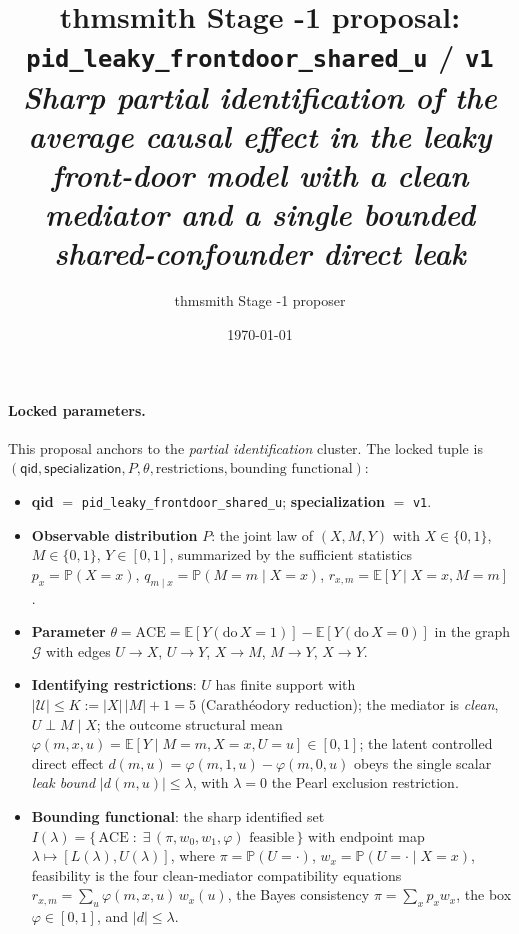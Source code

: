 \documentclass[11pt]{article}
\title{thmsmith Stage -1 proposal: \texttt{pid\_leaky\_frontdoor\_shared\_u} / \texttt{v1}%
  \\ \large\textit{Sharp partial identification of the average causal effect in the leaky front-door model with a clean mediator and a single bounded shared-confounder direct leak}}
\author{thmsmith Stage -1 proposer}
\date{\today}
\newcommand{\E}{\mathbb{E}}
\renewcommand{\Pr}{\mathbb{P}}
\theoremstyle{definition}
\theoremstyle{plain}
\theoremstyle{remark}
\begin{document}
\maketitle


\theoremstyle{definition}
\newtheorem{openendedquestion}{Open-ended Question}

\paragraph{Locked parameters.}
This proposal anchors to the \emph{partial identification} cluster. The locked
tuple is $(\textsf{qid},\textsf{specialization},P,\theta,\text{restrictions},\text{bounding functional})$:
\begin{itemize}[leftmargin=1.5em,itemsep=1pt]
  \item \textbf{qid} $=$ \texttt{pid\_leaky\_frontdoor\_shared\_u}; \textbf{specialization} $=$ \texttt{v1}.
  \item \textbf{Observable distribution} $P$: the joint law of $(X,M,Y)$ with $X\in\{0,1\}$,
        $M\in\{0,1\}$, $Y\in[0,1]$, summarized by the sufficient statistics
        $p_x=\Pr(X=x)$, $q_{m\mid x}=\Pr(M=m\mid X=x)$, $r_{x,m}=\E[Y\mid X=x,M=m]$.
  \item \textbf{Parameter} $\theta=\mathrm{ACE}=\E[Y(\mathrm{do}\,X=1)]-\E[Y(\mathrm{do}\,X=0)]$
        in the graph $\mathcal G$ with edges $U\to X$, $U\to Y$, $X\to M$, $M\to Y$, $X\to Y$.
  \item \textbf{Identifying restrictions}: $U$ has finite support with
        $|\mathcal U|\le K:=|X|\,|M|+1=5$ (Carath\'eodory reduction); the mediator is
        \emph{clean}, $U\perp M\mid X$; the outcome structural mean
        $\varphi(m,x,u)=\E[Y\mid M=m,X=x,U=u]\in[0,1]$; the latent controlled direct
        effect $d(m,u)=\varphi(m,1,u)-\varphi(m,0,u)$ obeys the single scalar
        \emph{leak bound} $|d(m,u)|\le\lambda$, with $\lambda=0$ the Pearl exclusion restriction.
  \item \textbf{Bounding functional}: the sharp identified set
        $I(\lambda)=\{\,\mathrm{ACE}\;:\;\exists\,(\pi,w_0,w_1,\varphi)\text{ feasible}\,\}$
        with endpoint map $\lambda\mapsto[L(\lambda),U(\lambda)]$, where $\pi=\Pr(U=\cdot)$,
        $w_x=\Pr(U=\cdot\mid X=x)$, feasibility is the four clean-mediator compatibility
        equations $r_{x,m}=\sum_u\varphi(m,x,u)\,w_x(u)$, the Bayes consistency
        $\pi=\sum_x p_x w_x$, the box $\varphi\in[0,1]$, and $|d|\le\lambda$.
\end{itemize}
\end{document}
